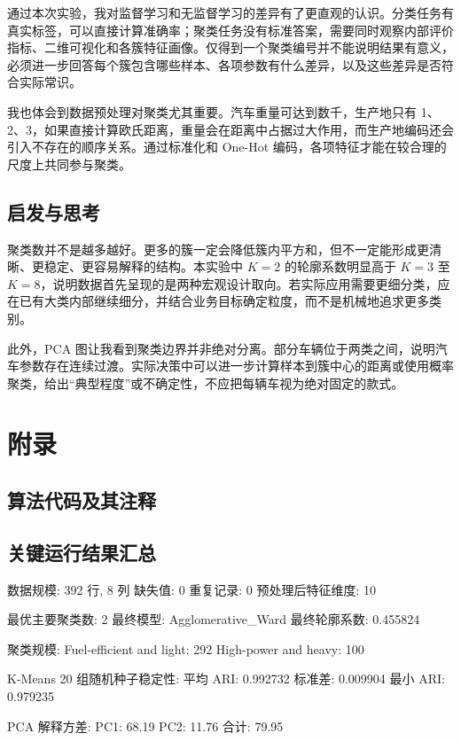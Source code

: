 \documentclass[UTF8,a4paper,12pt]{ctexart}
\begin{document}
通过本次实验，我对监督学习和无监督学习的差异有了更直观的认识。分类任务有真实标签，可以直接计算准确率；聚类任务没有标准答案，需要同时观察内部评价指标、二维可视化和各簇特征画像。仅得到一个聚类编号并不能说明结果有意义，必须进一步回答每个簇包含哪些样本、各项参数有什么差异，以及这些差异是否符合实际常识。

我也体会到数据预处理对聚类尤其重要。汽车重量可达到数千，生产地只有 1、2、3，如果直接计算欧氏距离，重量会在距离中占据过大作用，而生产地编码还会引入不存在的顺序关系。通过标准化和 One-Hot 编码，各项特征才能在较合理的尺度上共同参与聚类。

\subsection{启发与思考}

聚类数并不是越多越好。更多的簇一定会降低簇内平方和，但不一定能形成更清晰、更稳定、更容易解释的结构。本实验中 $K=2$ 的轮廓系数明显高于 $K=3$ 至 $K=8$，说明数据首先呈现的是两种宏观设计取向。若实际应用需要更细分类，应在已有大类内部继续细分，并结合业务目标确定粒度，而不是机械地追求更多类别。

此外，PCA 图让我看到聚类边界并非绝对分离。部分车辆位于两类之间，说明汽车参数存在连续过渡。实际决策中可以进一步计算样本到簇中心的距离或使用概率聚类，给出“典型程度”或不确定性，不应把每辆车视为绝对固定的款式。

\clearpage
\section{附录}

\subsection*{算法代码及其注释}


\clearpage
\subsection*{关键运行结果汇总}

\begin{CodeBlock}
数据规模: 392 行, 8 列
缺失值: 0
重复记录: 0
预处理后特征维度: 10

最优主要聚类数: 2
最终模型: Agglomerative_Ward
最终轮廓系数: 0.455824

聚类规模:
Fuel-efficient and light: 292
High-power and heavy: 100

K-Means 20 组随机种子稳定性:
平均 ARI: 0.992732
标准差: 0.009904
最小 ARI: 0.979235

PCA 解释方差:
PC1: 68.19%
PC2: 11.76%
合计: 79.95%
\end{CodeBlock}
\end{document}
